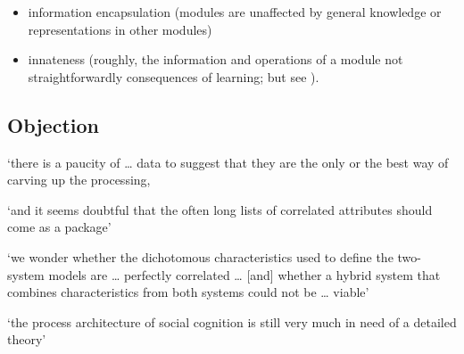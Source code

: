 \documentclass[12pt]{extarticle}
\begin{document}
\begin{multicols}{3}
\begin{itemize}
\item information encapsulation (modules are unaffected by general knowledge or representations in other modules)
 
\item innateness (roughly, the information and operations of a module not straightforwardly consequences of learning; but see \citet{Samuels:2004ho}).
 
\end{itemize}
 
\subsection{Objection}
 
‘there is a paucity of … data to suggest that they are the only or the best way of carving up the processing,
 
‘and it seems doubtful that the often long lists of correlated attributes should come as a package’
\citep[p.\ 759]{adolphs_conceptual_2010}
 
‘we wonder whether the dichotomous characteristics used to define the two-system models are … perfectly correlated …
[and] whether a hybrid system that combines characteristics from both systems could not be … viable’
\citep[p.\ 537]{keren_two_2009}
 
‘the process architecture of social cognition is still very much in need of a detailed theory’
\citep[p.\ 759]{adolphs_conceptual_2010}
\citep[p.\ 517]{Carey:1996hl}
 

 
\footnotesize 


\end{multicols}
\end{document}
